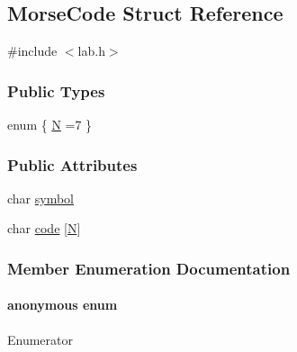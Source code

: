 \hypertarget{structMorseCode}{\subsection{Morse\+Code Struct Reference}
\label{structMorseCode}
}


{\ttfamily \#include $<$lab.\+h$>$}

\subsubsection*{Public Types}
\begin{DoxyCompactItemize}
\item 
enum \{ \hyperlink{structMorseCode_ab70bfb3505458b9ca361321710a3bf4ea255fc4372695bc3e775c82488bfc2dac}{N} =7
 \}
\end{DoxyCompactItemize}
\subsubsection*{Public Attributes}
\begin{DoxyCompactItemize}
\item 
char \hyperlink{structMorseCode_a15f3e521a3db80ec2f44a9c42b5cb949}{symbol}
\item 
char \hyperlink{structMorseCode_aeb273082df944b0bc60d1388f215b1b7}{code} \mbox{[}\hyperlink{structMorseCode_ab70bfb3505458b9ca361321710a3bf4ea255fc4372695bc3e775c82488bfc2dac}{N}\mbox{]}
\end{DoxyCompactItemize}


\subsubsection{Member Enumeration Documentation}
\hypertarget{structMorseCode_ab70bfb3505458b9ca361321710a3bf4e}{\paragraph[{anonymous enum}]{\setlength{\rightskip}{0pt plus 5cm}anonymous enum}}\label{structMorseCode_ab70bfb3505458b9ca361321710a3bf4e}
\begin{Desc}
\item[Enumerator]\par
\begin{description}
\item[{\em 
\hypertarget{structMorseCode_ab70bfb3505458b9ca361321710a3bf4ea255fc4372695bc3e775c82488bfc2dac}{N}\label{structMorseCode_ab70bfb3505458b9ca361321710a3bf4ea255fc4372695bc3e775c82488bfc2dac}
}]\end{description}
\end{Desc}

